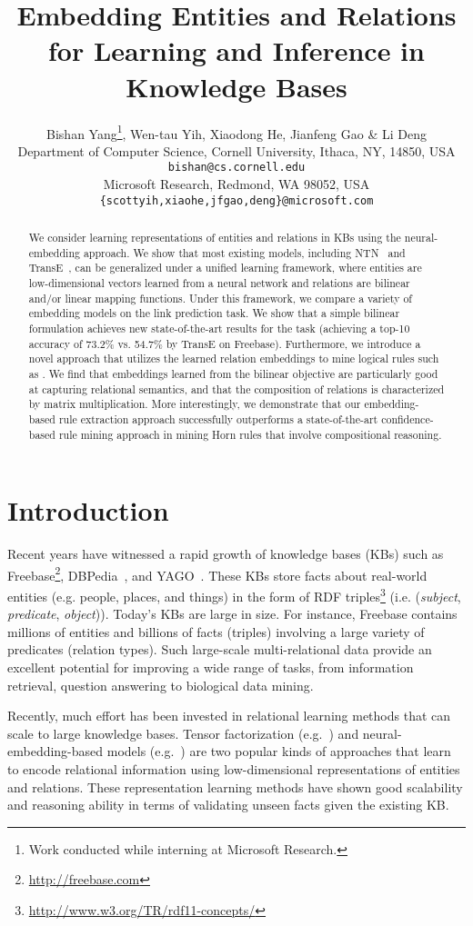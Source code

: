 \documentclass{article} \usepackage{iclr2015,times}
\title{Embedding Entities and Relations for Learning and Inference in Knowledge Bases}
\author{
Bishan Yang\thanks{Work conducted while interning at Microsoft Research.}, Wen-tau Yih, Xiaodong He, Jianfeng Gao \& Li Deng\\
Department of Computer Science, Cornell University, Ithaca, NY, 14850, USA\\
\texttt{bishan@cs.cornell.edu} \\
Microsoft Research, Redmond, WA 98052, USA\\
\texttt{\{scottyih,xiaohe,jfgao,deng\}@microsoft.com} \\
}
\begin{document}
\maketitle

\begin{abstract}
We consider learning representations of entities and relations in KBs using the neural-embedding approach. We show that most existing models, including NTN~\citep{SocherChenManningNg2013} and TransE~\citep{BordesUsGaWeYa2013}, can be generalized under a unified learning framework, where entities are low-dimensional vectors learned from a neural network and relations are bilinear and/or linear mapping functions. Under this framework, we compare a variety of embedding models on the link prediction task. We show that a simple bilinear formulation achieves new state-of-the-art results for the task (achieving a top-10 accuracy of 73.2\% vs. 54.7\% by TransE on Freebase). Furthermore, we introduce a novel approach that utilizes the learned relation embeddings to mine logical rules such as . We find that embeddings learned from the bilinear objective are particularly good at capturing relational semantics, and that the composition of relations is characterized by matrix multiplication. More interestingly, we demonstrate that our embedding-based rule extraction approach successfully outperforms a state-of-the-art confidence-based rule mining approach in mining Horn rules that involve compositional reasoning.
\end{abstract}

\section{Introduction}
Recent years have witnessed a rapid growth of knowledge bases (KBs) such as Freebase\footnote{\url{http://freebase.com}}, DBPedia~\citep{auer2007dbpedia}, and YAGO~\citep{suchanek2007yago}. These KBs store facts about real-world entities (e.g. people, places, and things) in the form of RDF triples\footnote{\url{http://www.w3.org/TR/rdf11-concepts/}} (i.e. (\textit{subject}, \textit{predicate}, \textit{object})). Today's KBs are large in size. For instance, Freebase contains millions of entities and billions of facts (triples) involving a large variety of predicates (relation types). Such large-scale multi-relational data provide an excellent potential for improving a wide range of tasks, from information retrieval, question answering to biological data mining. 

Recently, much effort has been invested in relational learning methods that can scale to large knowledge bases. Tensor factorization (e.g.~\citep{NickelTrKr11,nickel2012factorizing}) and neural-embedding-based models (e.g.~\citep{bordes2013energy,BordesUsGaWeYa2013,SocherChenManningNg2013}) are two popular kinds of approaches that learn to encode relational information using low-dimensional representations of entities and relations. These representation learning methods have shown good scalability and reasoning ability in terms of validating unseen facts given the existing KB.
\end{document}
